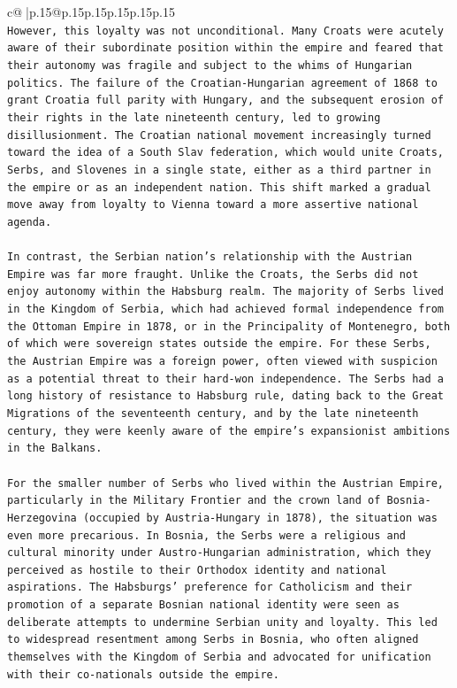 \documentclass{article}
\begin{document}
{\begin{supertabular}{c@{$\;$}|p{.15\linewidth}@{}p{.15\linewidth}p{.15\linewidth}p{.15\linewidth}p{.15\linewidth}p{.15\linewidth}}
{{{\\ 
\texttt{However, this loyalty was not unconditional. Many Croats were acutely aware of their subordinate position within the empire and feared that their autonomy was fragile and subject to the whims of Hungarian politics. The failure of the Croatian{-}Hungarian agreement of 1868 to grant Croatia full parity with Hungary, and the subsequent erosion of their rights in the late nineteenth century, led to growing disillusionment. The Croatian national movement increasingly turned toward the idea of a South Slav federation, which would unite Croats, Serbs, and Slovenes in a single state, either as a third partner in the empire or as an independent nation. This shift marked a gradual move away from loyalty to Vienna toward a more assertive national agenda.} \\
\\ 
\texttt{In contrast, the Serbian nation’s relationship with the Austrian Empire was far more fraught. Unlike the Croats, the Serbs did not enjoy autonomy within the Habsburg realm. The majority of Serbs lived in the Kingdom of Serbia, which had achieved formal independence from the Ottoman Empire in 1878, or in the Principality of Montenegro, both of which were sovereign states outside the empire. For these Serbs, the Austrian Empire was a foreign power, often viewed with suspicion as a potential threat to their hard{-}won independence. The Serbs had a long history of resistance to Habsburg rule, dating back to the Great Migrations of the seventeenth century, and by the late nineteenth century, they were keenly aware of the empire’s expansionist ambitions in the Balkans.} \\
\\ 
\texttt{For the smaller number of Serbs who lived within the Austrian Empire, particularly in the Military Frontier and the crown land of Bosnia{-}Herzegovina (occupied by Austria{-}Hungary in 1878), the situation was even more precarious. In Bosnia, the Serbs were a religious and cultural minority under Austro{-}Hungarian administration, which they perceived as hostile to their Orthodox identity and national aspirations. The Habsburgs’ preference for Catholicism and their promotion of a separate Bosnian national identity were seen as deliberate attempts to undermine Serbian unity and loyalty. This led to widespread resentment among Serbs in Bosnia, who often aligned themselves with the Kingdom of Serbia and advocated for unification with their co{-}nationals outside the empire.} \\
\\ 
}}}
\end{supertabular}}
\end{document}
